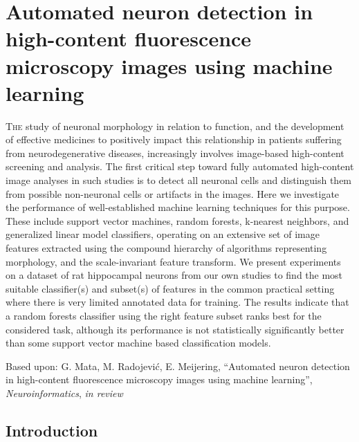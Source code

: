 %
%
\chpos{15mm}{8mm}
\chapter[Automated neuron detection in high-content fluorescence microscopy images using machine learning]{Automated neuron detection in high-content fluorescence microscopy images using machine learning}
\label{ch5:ndetchml}
{\small \lettrine{T}{he} study of neuronal morphology in relation to function, and the development of effective medicines to positively impact this relationship in patients suffering from neurodegenerative diseases, increasingly involves image-based high-content screening and analysis. The first critical step toward fully automated high-content image analyses in such studies is to detect all neuronal cells and distinguish them from possible non-neuronal cells or artifacts in the images. Here we investigate the performance of well-established machine learning techniques for this purpose. These include
	support vector machines, random forests, k-nearest neighbors,
	and generalized linear model classifiers, operating on
	an extensive set of image features extracted using the compound
	hierarchy of algorithms representing morphology, and
	the scale-invariant feature transform. We present experiments
	on a dataset of rat hippocampal neurons from our own studies
	to find the most suitable classifier(s) and subset(s) of features
	in the common practical setting where there is very
	limited annotated data for training. The results indicate that
	a random forests classifier using the right feature subset ranks
	best for the considered task, although its performance is not
	statistically significantly better than some support vector machine
	based classification models.\par}
\vspace*{12em}
\begin{publish}
	Based upon: G. Mata, M. Radojevi\'{c}, E. Meijering, ``Automated neuron detection in high-content fluorescence microscopy images using machine learning'', \textit{Neuroinformatics}, \textit{in review}
\end{publish}%
\section{Introduction}
\label{sec:intro}

